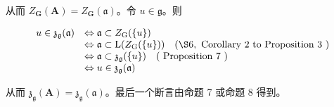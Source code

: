从而 \(Z_{\mathbf{G}}(\mathbf{A}) = Z_{\mathbf{G}}(\mathfrak{a})\)。令 \(u \in \mathfrak{g}\)。则

\[
\begin{array}{r l} u \in \mathfrak{z}_{\mathfrak{g}}(\mathfrak{a}) & \Leftrightarrow \mathfrak{a} \subset Z_{\mathrm{G}} (\{u\}) \\ & \Leftrightarrow \mathfrak{a} \subset \mathrm{L} (Z_{\mathrm{G}} (\{u\})) \quad (\S 6, \text { Corollary   2   to   Proposition   3 }) \\ & \Leftrightarrow \mathfrak{a} \subset \mathfrak{z}_{\mathfrak{g}} (\{u\}) \quad (\text { Proposition   7 }) \\ & \Leftrightarrow u \in \mathfrak{z}_{\mathfrak{g}} (\mathfrak{a}) \end{array}
\]

从而 \(\mathfrak{z}_{\mathfrak{g}}(\mathbf{A}) = \mathfrak{z}_{\mathfrak{g}}(\mathfrak{a})\)。最后一个断言由命题 7 或命题 8 得到。

